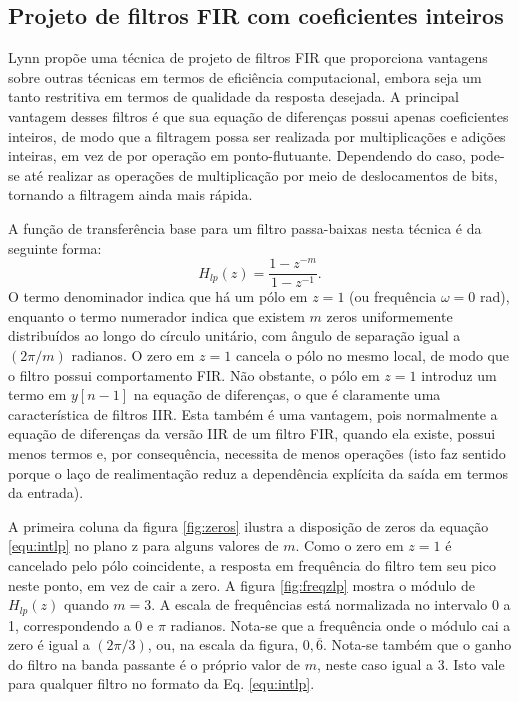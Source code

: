 \subsection*{Projeto de filtros FIR com coeficientes inteiros}
Lynn \cite{Lynn1977} propõe uma técnica de projeto de filtros FIR que proporciona vantagens sobre outras técnicas em termos de eficiência computacional, embora seja um tanto restritiva em termos de qualidade da resposta desejada. A principal vantagem desses filtros é que sua equação de diferenças possui apenas coeficientes inteiros, de modo que a filtragem possa ser realizada por multiplicações e adições inteiras, em vez de por operação em ponto-flutuante. Dependendo do caso, pode-se até realizar as operações de multiplicação por meio de deslocamentos de bits, tornando a filtragem ainda mais rápida.

A função de transferência base para um filtro passa-baixas nesta técnica é da seguinte forma:
\begin{equation}
     H_{lp}(z) = \frac{1-z^{-m}}{1-z^{-1}}.
     \label{equ:intlp}
\end{equation}
O termo denominador indica que há um pólo em $z=1$ (ou frequência $\omega =0$ rad), enquanto o termo numerador indica que existem $m$ zeros uniformemente distribuídos ao longo do círculo unitário, com ângulo de separação igual a $(2\pi/m)$ radianos. O zero em $z=1$ cancela o pólo no mesmo local, de modo que o filtro possui comportamento FIR. Não obstante, o pólo em $z=1$ introduz um termo em $y[n-1]$ na equação de diferenças, o que é claramente uma característica de filtros IIR. Esta também é uma vantagem, pois normalmente a equação de diferenças da versão IIR de um filtro FIR, quando ela existe, possui menos termos e, por consequência, necessita de menos operações (isto faz sentido porque o laço de realimentação reduz a dependência explícita da saída em termos da entrada).

A primeira coluna da figura \ref{fig:zeros} ilustra a disposição de zeros da equação \ref{equ:intlp} no plano z para alguns valores de $m$. Como o zero em $z=1$ é cancelado pelo pólo coincidente, a resposta em frequência do filtro tem seu pico neste ponto, em vez de cair a zero. A figura \ref{fig:freqzlp} mostra o módulo de $H_{lp}(z)$ quando $m=3$. A escala de frequências está normalizada no intervalo 0 a 1, correspondendo a 0 e $\pi$ radianos. Nota-se que a frequência onde o módulo cai a zero é igual a $(2\pi/3)$, ou, na escala da figura, $0,\overline{6}$. Nota-se também que o ganho do filtro na banda passante é o próprio valor de $m$, neste caso igual a 3. Isto vale para qualquer filtro no formato da Eq. \ref{equ:intlp}.

